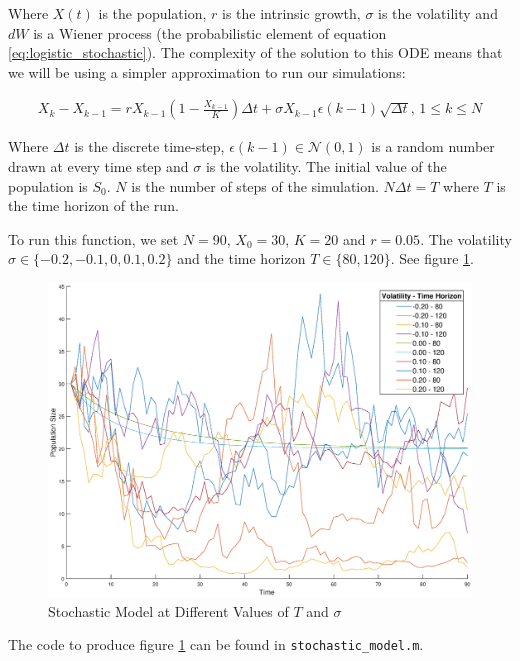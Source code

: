 \documentclass[]{article}
\def\incode#1{\texttt{#1}}
\begin{document}
	Where $X(t)$ is the population, $r$ is the intrinsic growth, $\sigma$ is the volatility and $dW$ is a Wiener process (the probabilistic element of equation \ref{eq:logistic_stochastic}). The complexity of the solution to this ODE means that we will be using a simpler approximation to run our simulations: 
	
	\begin{align}
		X_k - X_{k - 1} = rX_{k - 1}\left(1 - \frac{X_{k - 1}}{K}\right)\Delta t + \sigma X_{k - 1}\epsilon (k - 1)\sqrt{\Delta t}, \hspace{2pt} 1 \leq k \leq N
	\end{align}
	
	Where $\Delta t$ is the discrete time-step, $\epsilon (k - 1) \in \mathcal{N}(0, 1)$ is a random number drawn at every time step and $\sigma$ is the volatility. The initial value of the population is $S_0$. $N$ is the number of steps of the simulation. $N \Delta t = T$ where $T$ is the time horizon of the run. 
	
	To run this function, we set $N = 90$, $X_0 = 30$, $K = 20$ and $r = 0.05$. The volatility $\sigma \in \{-0.2, -0.1, 0, 0.1, 0.2\}$ and the time horizon $T \in \{80, 120\}$. See figure \ref{fig:stochastic_model}.
	
	\begin{figure}[h!]
		\centering
		\includegraphics[scale=0.29]{images/stochastic_model.eps}
		\caption{Stochastic Model at Different Values of $T$ and $\sigma$}
		\label{fig:stochastic_model}
	\end{figure}

	The code to produce figure \ref{fig:stochastic_model} can be found in \incode{stochastic\_model.m}.
	
\end{document}
